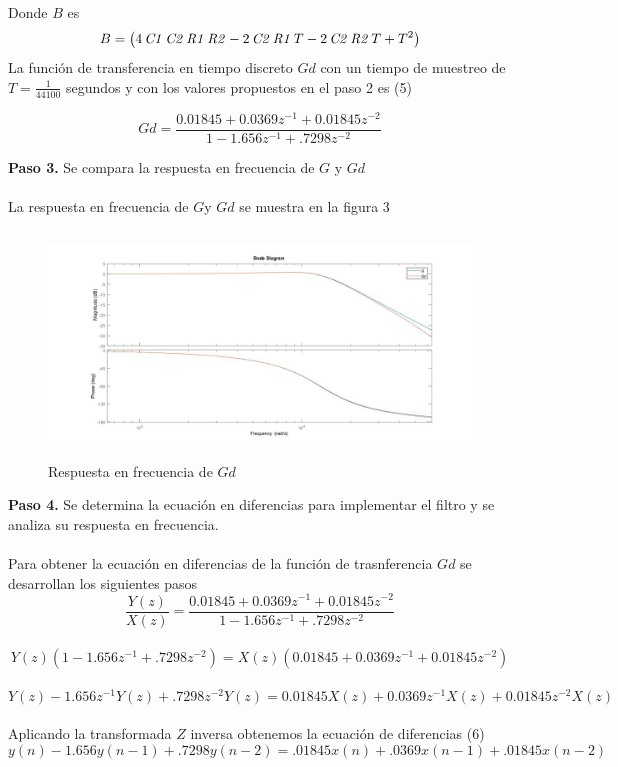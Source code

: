 \documentclass[12pt]{article}
\begin{document}
Donde $B$ es
$$B=\left( 4\,{\it C1}\,{\it C2}
\,{\it R1}\,{\it R2}-2\,{\it C2}\,{\it R1}\,T-2\,{\it C2}\,{\it R2}\,T
+{T}^{2} \right)$$
La función de transferencia en tiempo discreto $Gd$ con un tiempo de muestreo de $T=\frac{1}{44100}$ segundos y con los valores propuestos en el paso 2 es (5)

\begin{equation}
Gd=\frac{0.01845+0.0369z^{-1}+0.01845z^{-2}}{1-1.656z^{-1}+.7298z^{-2}}
\end{equation}

\textbf{Paso 3.} Se compara la respuesta en frecuencia de $G$ y $Gd$\\\\
La respuesta en frecuencia de $G$y $Gd$ se muestra en la figura 3

\begin{figure}[h]
        \centering
        \includegraphics[width=14cm, height=6cm]{im2.jpg}
        \caption{Respuesta en frecuencia de $Gd$}
\end{figure}

\textbf{Paso 4.} Se determina la ecuación en diferencias para implementar el filtro y se analiza su respuesta en frecuencia.\\\\

Para obtener la ecuación en diferencias de la función de trasnferencia $Gd$ se desarrollan los siguientes pasos
$$\frac{Y(z)}{X(z)}=\frac{0.01845+0.0369z^{-1}+0.01845z^{-2}}{1-1.656z^{-1}+.7298z^{-2}}$$\\
$$Y(z)(1-1.656z^{-1}+.7298z^{-2})=X(z)(0.01845+0.0369z^{-1}+0.01845z^{-2})$$\\
$$Y(z)-1.656z^{-1}Y(z)+.7298z^{-2}Y(z)=0.01845X(z)+0.0369z^{-1}X(z)+0.01845z^{-2}X(z)$$\\
Aplicando la transformada $Z$ inversa obtenemos la ecuación de diferencias (6)
\begin{equation}
    y(n)-1.656y(n-1)+.7298y(n-2)=.01845x(n)+.0369x(n-1)+.01845x(n-2)
\end{equation}
\end{document}
